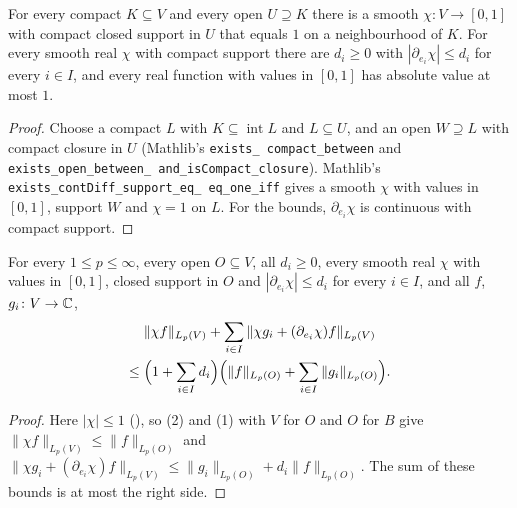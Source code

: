 \begin{lemma}
\label{lem:smooth-cutoff-compact}
\leanok
For every compact $K \subseteq V$ and every open $U \supseteq K$ there is a smooth
$\chi \colon V \to [0, 1]$ with compact closed support in $U$ that equals $1$ on a neighbourhood
of $K$. For every smooth real $\chi$ with compact support there are $d_i \geq 0$ with
$|\partial_{e_i} \chi| \leq d_i$ for every $i \in I$, and every real function with values in
$[0, 1]$ has absolute value at most $1$.
\end{lemma}

\begin{proof}
\leanok
Choose a compact $L$ with $K \subseteq \operatorname{int} L$ and $L \subseteq U$, and an open
$W \supseteq L$ with compact closure in $U$ (Mathlib's \texttt{exists\_\allowbreak
compact\_\allowbreak between} and \texttt{exists\_\allowbreak open\_\allowbreak between\_\allowbreak
and\_\allowbreak isCompact\_\allowbreak closure}). Mathlib's
\texttt{exists\_\allowbreak contDiff\_\allowbreak support\_\allowbreak eq\_\allowbreak
eq\_\allowbreak one\_\allowbreak iff} gives a smooth $\chi$ with values in $[0, 1]$, support $W$
and $\chi = 1$ on $L$. For the bounds, $\partial_{e_i} \chi$ is continuous with compact support.
\end{proof}

\begin{lemma}
\label{lem:cutoff-bound-whole-space}
\leanok
{}
For every $1 \leq p \leq \infty$, every open $O \subseteq V$, all $d_i \geq 0$, every smooth real
$\chi$ with values in $[0, 1]$, closed support in $O$ and $|\partial_{e_i} \chi| \leq d_i$ for
every $i \in I$, and all $f$, $g_i \colon V \to \mathbb{C}$,
\begin{multline*}
  \|\chi f\|_{L_p(V)} + \sum_{i \in I} \|\chi g_i + (\partial_{e_i} \chi) f\|_{L_p(V)} \\
  \leq \Bigl(1 + \sum_{i \in I} d_i\Bigr) \Bigl(\|f\|_{L_p(O)} + \sum_{i \in I}
  \|g_i\|_{L_p(O)}\Bigr) .
\end{multline*}
\end{lemma}

\begin{proof}
\leanok
Here $|\chi| \leq 1$ (), so  (2)
and (1) with $V$ for $O$ and $O$ for $B$ give $\|\chi f\|_{L_p(V)} \leq \|f\|_{L_p(O)}$ and
$\|\chi g_i + (\partial_{e_i} \chi) f\|_{L_p(V)} \leq \|g_i\|_{L_p(O)} + d_i \|f\|_{L_p(O)}$.
The sum of these bounds is at most the right side.
\end{proof}

